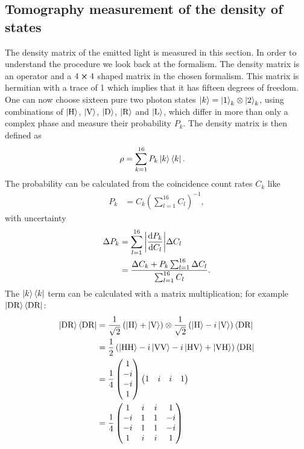 \subsection{Tomography measurement of the density of states}
The density matrix of the emitted light is measured in this section.
In order to understand the procedure we look back at the formalism.
The density matrix is an operator and
a $4\cross 4$ shaped matrix in the chosen formalism.
This matrix is hermitian with a trace of 1 which implies that it has fifteen degrees of freedom.
One can now choose sixteen pure two photon states $\ket{k}=\ket{1}_k\otimes\ket{2}_k$, using combinations of $\left|\text{H}\right\rangle$, $\left|\text{V}\right\rangle$, $\left|\text{D}\right\rangle$, $\left|\text{R}\right\rangle$ and $\left|\text{L}\right\rangle$, which differ in more than only a complex phase and measure their probability $P_k$.
The density matrix is then defined as
\begin{align}
\rho
    &=\sum_{k=1}^{16}P_k\ket{k}\bra{k}.
    \label{eq:a:rho}
\end{align}
The probability can be calculated from the coincidence count rates $C_k$ like
\begin{align}
P_k
    &=C_k \left(\sum_{l=1}^{16}C_l\right)^{-1},
    \label{eq:a:Pk}
\end{align}
with uncertainty
\begin{subequations}
\label{eq:a:dP}
\begin{align}
\Delta P_k
    &=\sum_{l=1}^{16}\abs{\frac{\dd P_k}{\dd C_l}}\Delta C_l
    \label{eq:a:dP:1}\\
    &=\frac{\Delta C_k+P_k\sum_{l=1}^{16}\Delta C_l}{\sum_{l=1}^{16}C_l}.
    \label{eq:a:dP:2}
\end{align}
\end{subequations}
The $\ket{k}\bra{k}$ term can be calculated with a matrix multiplication; for example $\left|\text{DR}\right\rangle\left\langle\text{DR}\right|$:
\begin{subequations}
\label{eq:a:DR}
\begin{align}
\left|\text{DR}\right\rangle\left\langle\text{DR}\right|
    &=\frac{1}{\sqrt{2}}\left(\left|\text{H}\right\rangle+\left|\text{V}\right\rangle\right) \otimes \frac{1}{\sqrt{2}}\left(\left|\text{H}\right\rangle-i\left|\text{V}\right\rangle\right) \left\langle\text{DR}\right|
    \label{eq:a:DR:1}\\
    &=\frac{1}{2}\left(\left|\text{HH}\right\rangle-i\left|\text{VV}\right\rangle-i\left|\text{HV}\right\rangle+\left|\text{VH}\right\rangle\right) \left\langle\text{DR}\right|
    \label{eq:a:DR:2}\\
    &=\frac{1}{4}
    \begin{pmatrix}1\\-i\\-i\\1\end{pmatrix}
    \begin{pmatrix}1&i&i&1\end{pmatrix}
    \label{eq:a:DR:3}\\
    &=\frac{1}{4}\begin{pmatrix}
    1   &i  &i  &1\\
    -i  &1  &1  &-i\\
    -i  &1  &1  &-i\\
    1   &i  &i  &1
    \end{pmatrix}
\end{align}
\end{subequations}
